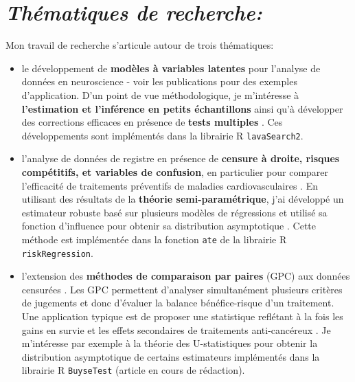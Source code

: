 \documentclass[12pt]{article}
\begin{document}
\section*{\emph{Thématiques de recherche:}}
\label{sec:orgeb456ec}
{ \justify
Mon travail de recherche s'articule autour de trois thématiques:
\begin{itemize}
\item le développement de \textbf{modèles à variables latentes} pour l'analyse de
données en neuroscience - voir les publications
\cite{ebert2019molecular,stenbaek2017brain,fisher2017bdnf} pour des
exemples d'application. D'un point de vue méthodologique, je
m'intéresse à \textbf{l'estimation et l'inférence en petits échantillons}
\citep{ozenne20XXsmall} ainsi qu'à développer des corrections
efficaces en présence de \textbf{tests multiples}
\citep{ozenne20XXcontroling}. Ces développements sont implémentés dans
la librairie R \texttt{lavaSearch2}.
\end{itemize}

\bigskip

\begin{itemize}
\item l'analyse de données de registre en présence de \textbf{censure à droite,
risques compétitifs, et variables de confusion}, en particulier pour
comparer l'efficacité de traitements préventifs de maladies
cardiovasculaires
\citep{staerk2016ischaemic,staerk2017resumption,staerk2018standard}. En
utilisant des résultats de la \textbf{théorie semi-paramétrique}, j'ai
développé un estimateur robuste basé sur plusieurs modèles de
régressions et utilisé sa fonction d'influence pour obtenir sa
distribution asymptotique \citep{ozenne2020estimation}. Cette méthode
est implémentée dans la fonction \texttt{ate} de la librairie R
\texttt{riskRegression}.
\end{itemize}

\bigskip

\begin{itemize}
\item l'extension des \textbf{méthodes de comparaison par paires} (GPC) aux
données censurées \citep{peron2016extension}. Les GPC permettent
d'analyser simultanément plusieurs critères de jugements et donc
d'évaluer la balance bénéfice-risque d'un traitement. Une
application typique est de proposer une statistique reflétant à la
fois les gains en survie et les effets secondaires de traitements
anti-cancéreux \citep{peron2016net,peron2016assessment}. Je
m'intéresse par exemple à la théorie des U-statistiques pour obtenir
la distribution asymptotique de certains estimateurs implémentés
dans la librairie R \texttt{BuyseTest} (article en cours de rédaction).
\end{itemize}
}
\end{document}
